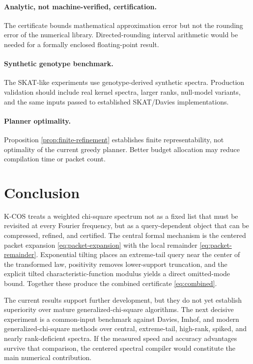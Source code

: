 \documentclass[11pt]{article}
\theoremstyle{definition}
\begin{document}
\paragraph{Analytic, not machine-verified, certification.}
The certificate bounds mathematical approximation error but not the rounding error of the numerical library. Directed-rounding interval arithmetic would be needed for a formally enclosed floating-point result.

\paragraph{Synthetic genotype benchmark.}
The SKAT-like experiments use genotype-derived synthetic spectra. Production validation should include real kernel spectra, larger ranks, null-model variants, and the same inputs passed to established SKAT/Davies implementations.

\paragraph{Planner optimality.}
Proposition \ref{prop:finite-refinement} establishes finite representability, not optimality of the current greedy planner. Better budget allocation may reduce compilation time or packet count.

\section{Conclusion}

K-COS treats a weighted chi-square spectrum not as a fixed list that must be revisited at every Fourier frequency, but as a query-dependent object that can be compressed, refined, and certified. The central formal mechanism is the centered packet expansion \eqref{eq:packet-expansion} with the local remainder \eqref{eq:packet-remainder}. Exponential tilting places an extreme-tail query near the center of the transformed law, positivity removes lower-support truncation, and the explicit tilted characteristic-function modulus yields a direct omitted-mode bound. Together these produce the combined certificate \eqref{eq:combined}.

The current results support further development, but they do not yet establish superiority over mature generalized-chi-square algorithms. The next decisive experiment is a common-input benchmark against Davies, Imhof, and modern generalized-chi-square methods over central, extreme-tail, high-rank, spiked, and nearly rank-deficient spectra. If the measured speed and accuracy advantages survive that comparison, the centered spectral compiler would constitute the main numerical contribution.
\end{document}
